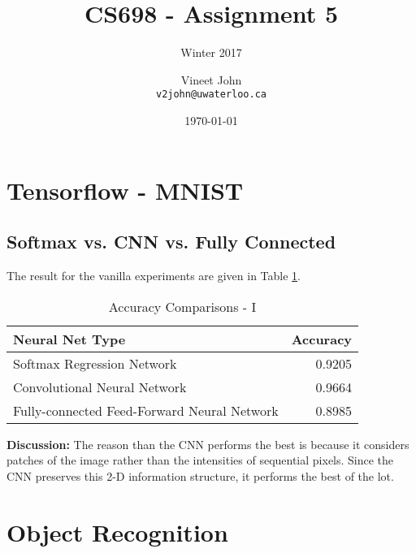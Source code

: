 \documentclass[parskip=half]{scrartcl}
\begin{document}
\title{CS698 - Assignment 5}
\subtitle{Winter 2017}
\author{
    Vineet John\\
    \texttt{v2john@uwaterloo.ca}
}
\date{\today}
\maketitle


\section{Tensorflow - MNIST} %
\label{sec:tensorflow_mnist}

    \subsection{Softmax vs. CNN vs. Fully Connected} %
    \label{sub:softmax_vs_cnn_vs_fully_connected}

        The result for the vanilla experiments are given in Table \ref{tab:accuracy_comparisons_i}.
        \begin{table}[th]
            \centering
            \begin{tabular}{| l | r |}
            \hline
            \textbf{Neural Net Type} & \textbf{Accuracy} \\
            \hline
                \hline
                Softmax Regression Network & 0.9205 \\
                \hline
                Convolutional Neural Network & 0.9664 \\
                \hline
                Fully-connected Feed-Forward Neural Network & 0.8985 \\
            \hline
            \end{tabular}
            \caption{Accuracy Comparisons - I}
            \label{tab:accuracy_comparisons_i}
        \end{table}

        \textbf{Discussion:}
        The reason than the CNN performs the best is because it considers patches of the image rather than the intensities of sequential pixels. Since the CNN preserves this 2-D information structure, it performs the best of the lot.
    



\section{Object Recognition} %
\label{sec:object_recognition}

\end{document}

